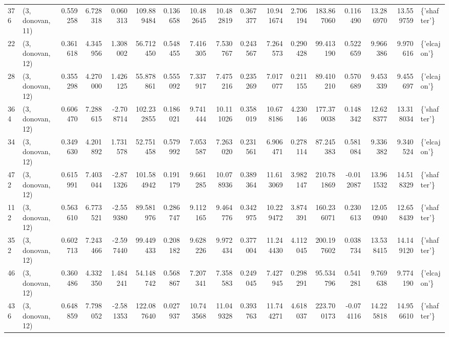 \begin{tabular}{llrrrrrrrrrrrrrrl}
376 &  (3, donovan, 11) &   0.559258 &   6.728318 &   0.060313 &   109.889484 &   0.136658 &  10.482645 &  10.482819 &  0.367377 &  10.941674 &   2.706194 &   183.867060 &   0.116490 &  13.286970 &  13.559759 &  \{'shafter'\} \\
22  &  (3, donovan, 12) &   0.361618 &   4.345956 &   1.308002 &    56.712450 &   0.548455 &   7.416305 &   7.530767 &  0.243567 &   7.264573 &   0.290428 &    99.413190 &   0.522659 &   9.966386 &   9.970616 &  \{'elcajon'\} \\
28  &  (3, donovan, 12) &   0.355298 &   4.270000 &   1.426125 &    55.878861 &   0.555092 &   7.337917 &   7.475216 &  0.235269 &   7.017077 &   0.211155 &    89.410210 &   0.570689 &   9.453339 &   9.455697 &  \{'elcajon'\} \\
364 &  (3, donovan, 12) &   0.606470 &   7.288615 &  -2.708714 &   102.232855 &   0.186021 &   9.741444 &  10.111026 &  0.358019 &  10.678186 &   4.230146 &   177.370038 &   0.148342 &  12.628377 &  13.318034 &  \{'shafter'\} \\
34  &  (3, donovan, 12) &   0.349630 &   4.201892 &   1.731578 &    52.751458 &   0.579992 &   7.053587 &   7.263020 &  0.231561 &   6.906471 &   0.278114 &    87.245383 &   0.581084 &   9.336382 &   9.340524 &  \{'elcajon'\} \\
472 &  (3, donovan, 12) &   0.615991 &   7.403044 &  -2.871326 &   101.584942 &   0.191179 &   9.661285 &  10.078936 &  0.389364 &  11.613069 &   3.982147 &   210.781869 &  -0.012087 &  13.961532 &  14.518329 &  \{'shafter'\} \\
112 &  (3, donovan, 12) &   0.563610 &   6.773521 &  -2.559380 &    89.581976 &   0.286747 &   9.112165 &   9.464776 &  0.342975 &  10.229472 &   3.874391 &   160.236071 &   0.230613 &  12.050940 &  12.658439 &  \{'shafter'\} \\
352 &  (3, donovan, 12) &   0.602713 &   7.243466 &  -2.597440 &    99.449433 &   0.208182 &   9.628226 &   9.972434 &  0.377004 &  11.244430 &   4.112045 &   200.197602 &   0.038734 &  13.538415 &  14.149120 &  \{'shafter'\} \\
46  &  (3, donovan, 12) &   0.360486 &   4.332350 &   1.484241 &    54.148742 &   0.568867 &   7.207341 &   7.358583 &  0.249045 &   7.427945 &   0.298291 &    95.534796 &   0.541281 &   9.769638 &   9.774190 &  \{'elcajon'\} \\
436 &  (3, donovan, 12) &   0.648859 &   7.798052 &  -2.581353 &   122.087640 &   0.027937 &  10.743568 &  11.049328 &  0.393763 &  11.744271 &   4.618037 &   223.700173 &  -0.074116 &  14.225818 &  14.956610 &  \{'shafter'\} \\

\end{tabular}
